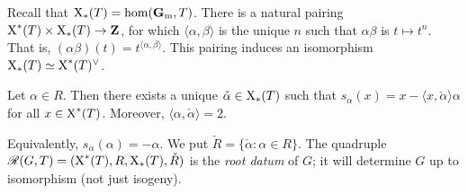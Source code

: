 Recall that $\operatorname{X}_\ast(T)=\hom(\mathbf{G}_\mathrm{m},T)$. There is a natural pairing 
$\operatorname{X}^\ast(T)\times \operatorname{X}_\ast(T)\to \mathbf{Z}$, for which 
$\langle \alpha,\beta\rangle$ is the unique $n$ such that $\alpha\beta$ is 
$t\mapsto t^n$. That is, $(\alpha\beta)(t) = t^{\langle\alpha,\beta\rangle}$. 
This pairing induces an isomorphism 
$\operatorname{X}_\ast(T)\simeq \operatorname{X}^\ast(T)^\vee$. 

\begin{theorem}
Let $\alpha\in R$. Then there exists a unique 
$\check\alpha\in \operatorname{X}_\ast(T)$ such that 
$s_\alpha(x) = x-\langle x,\check\alpha\rangle\alpha$ for all 
$x\in \operatorname{X}^\ast(T)$. Moreover, $\langle\alpha,\check\alpha\rangle=2$. 
\end{theorem}

Equivalently, $s_\alpha(\alpha)=-\alpha$. We put 
$\check R=\{\check\alpha:\alpha\in R\}$. The quadruple 
$\mathscr{R}(G,T) = (\operatorname{X}^\ast(T),R,\operatorname{X}_\ast(T),\check R)$ is the 
\emph{root datum} of $G$; it will determine $G$ up to isomorphism (not just 
isogeny). 





